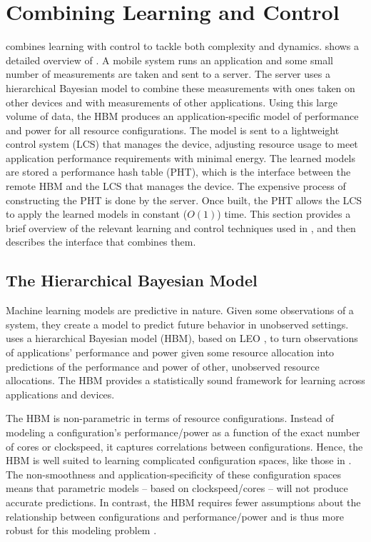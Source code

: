 \section{Combining Learning and Control}
\label{sec:framework}

\SYSTEM{} combines learning with control to tackle both complexity and
dynamics.   shows a detailed overview of
\SYSTEM{}.  A mobile system runs an application and some small number
of measurements are taken and sent to a server. The server uses a
hierarchical Bayesian model to combine these measurements with ones
taken on other devices and with measurements of other applications.
Using this large volume of data, the HBM produces an
application-specific model of performance and power for all resource
configurations.  The model is sent to a lightweight control system
(LCS) that manages the device, adjusting resource usage to meet
application performance requirements with minimal energy.  The learned
models are stored a performance hash table (PHT), which is the
interface between the remote HBM and the LCS that manages the device.
The expensive process of constructing the PHT is done by the server.
Once built, the PHT allows the LCS to apply the learned models in
constant ($O(1)$) time.  This section provides a brief overview of the
relevant learning and control techniques used in \SYSTEM{}, and then
describes the interface that combines them.

\subsection{The Hierarchical Bayesian Model}
\label{sec:framework:HBM}


Machine learning models are predictive in nature.  Given some
observations of a system, they create a model to predict future
behavior in unobserved settings. \SYSTEM{} uses a hierarchical
Bayesian model (HBM), based on LEO \cite{LEO}, to turn observations of
applications' performance and power given some resource allocation
into predictions of the performance and power of other, unobserved resource allocations.  The HBM provides a statistically
sound framework for learning across applications and devices.

The HBM is non-parametric in terms of resource configurations. Instead
of modeling a configuration's performance/power as a function of 
the exact number of cores or clockspeed, it captures correlations between
configurations.  Hence, the HBM is well suited to learning complicated
configuration spaces, like those in
.  The non-smoothness
and application-specificity of these configuration spaces means that
parametric models -- based on clockspeed/cores -- will not produce accurate predictions.  In contrast, the HBM requires fewer assumptions about the
relationship between configurations and performance/power and is thus
more robust for this modeling problem \cite{LEO}.

